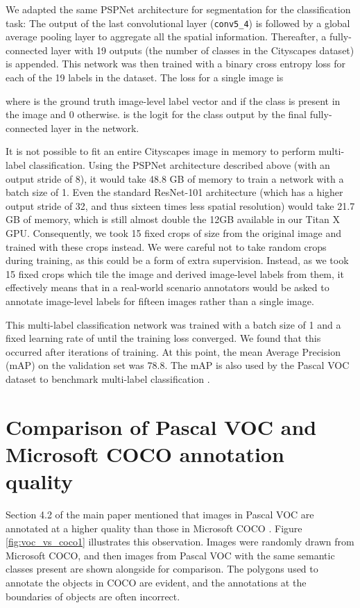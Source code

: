 \documentclass[runningheads]{llncs}
\begin{document}
We adapted the same PSPNet \cite{zhao_cvpr_2017} architecture for segmentation for the classification task:
The output of the last convolutional layer (\texttt{conv5\_4}) is followed by a global average pooling layer to aggregate all the spatial information.
Thereafter, a fully-connected layer with 19 outputs (the number of classes in the Cityscapes dataset) is appended.
This network was then trained with a binary cross entropy loss for each of the 19 labels in the dataset.
The loss for a single image is

where  is the ground truth image-level label vector and  if the  class is present in the image and 0 otherwise.  is the logit for the  class output by the final fully-connected layer in the network.

It is not possible to fit an entire  Cityscapes image in memory to perform multi-label classification.
Using the PSPNet architecture described above (with an output stride of 8), it would take 48.8 GB of memory to train a network with a batch size of 1.
Even the standard ResNet-101 architecture \cite{he_cvpr_2016} (which has a higher output stride of 32, and thus sixteen times less spatial resolution) would take 21.7 GB of memory, which is still almost double the 12GB available in our Titan X GPU.
Consequently, we took 15 fixed crops of size  from the original  image and trained with these crops instead.
We were careful not to take random crops during training, as this could be a form of extra supervision.
Instead, as we took 15 fixed crops which tile the image and derived image-level labels from them, it effectively means that in a real-world scenario annotators would be asked to annotate image-level labels for fifteen  images rather than a single  image.

This multi-label classification network was trained with a batch size of 1 and a fixed learning rate of  until the training loss converged.
We found that this occurred after  iterations of training.
At this point, the mean Average Precision (mAP) on the validation set was 78.8.
The mAP is also used by the Pascal VOC dataset to benchmark multi-label classification \cite{everingham_2010}.
 \section{Comparison of Pascal VOC and Microsoft COCO annotation quality}
\label{sec:pascal_vs_coco_gt}

Section 4.2 of the main paper mentioned that images in Pascal VOC \cite{everingham_2010} are annotated at a higher quality than those in Microsoft COCO \cite{lin_2014}.
Figure \ref{fig:voc_vs_coco1} illustrates this observation.
Images were randomly drawn from Microsoft COCO, and then images from Pascal VOC with the same semantic classes present are shown alongside for comparison.
The polygons used to annotate the objects in COCO are evident, and the annotations at the boundaries of objects are often incorrect.
\end{document}
